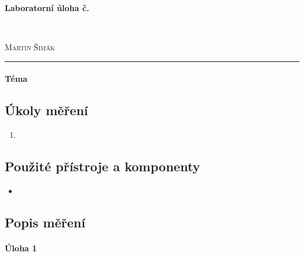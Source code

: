 \documentclass[11pt,a4paper]{article}
\begin{document}

\begin{center}
    {\LARGE\textbf{Laboratorní úloha č.}}\\[3mm]
    \begin{minipage}{0.4\textwidth}
        \begin{flushleft}
            \textsc{}
        \end{flushleft}
    \end{minipage}
    ~
    \begin{minipage}{0.4\textwidth}
        \begin{flushright}
            \textsc{Martin Šimák}
        \end{flushright}
    \end{minipage}
    \noindent\rule{14.5cm}{0.4pt}
\end{center}

\paragraph*{Téma} \lipsum[5]

\subsection*{Úkoly měření}
\begin{enumerate}
    \item 
\end{enumerate}

\subsection*{Použité přístroje a komponenty}
\begin{itemize}
    \item 
\end{itemize}

\subsection*{Popis měření}
\lipsum[1]

\paragraph*{Úloha 1} \lipsum[5]

\end{document}
